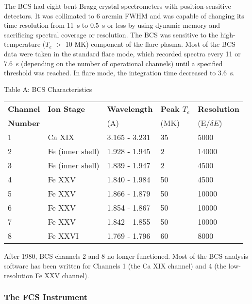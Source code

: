 The BCS had eight bent Bragg crystal spectrometers with position-sensitive
detectors. It was collimated to 6 arcmin FWHM and was capable of changing its
time resolution from 11~s to 0.5~s or less by using dynamic memory and
sacrificing spectral coverage or resolution. The BCS was sensitive to the 
high-temperature ($T_e$ $>$ 10 MK) component of the flare plasma. Most of the
BCS data were taken in the standard flare mode, which recorded spectra every 11
or 7.6~s (depending on the number of operational channels) until a specified
threshold was reached. In flare mode, the integration time decreased to
3.6~s. 

\begin{center}
                     Table A: BCS Characteristics
\bigskip
\begin{tabular}{||l l l l l ||}
\hline
{\bf Channel} &  {\bf Ion Stage} &   {\bf Wavelength}  &   {\bf Peak $T_e$} & 
{\bf Resolution} \\
{\bf Number}  &                  &         (A)         &   (MK)  &(E/$\delta E$)  \\
\hline
   1  &    Ca XIX          &  3.165 - 3.231   &    35     &        5000  \\
   2  &    Fe (inner shell)&  1.928 - 1.945   &     2     &       14000  \\
   3  &    Fe (inner shell)&  1.839 - 1.947   &     2     &        4500  \\
   4  &    Fe XXV          &  1.840 - 1.984   &    50     &        4500  \\
   5  &    Fe XXV          &  1.866 - 1.879   &    50     &       10000  \\
   6  &    Fe XXV          &  1.854 - 1.867   &    50     &       10000  \\
   7  &    Fe XXV          &  1.842 - 1.855   &    50     &       10000  \\
   8  &    Fe XXVI         &  1.769 - 1.796   &    60     &        8000  \\
\hline
\end{tabular}
\end{center}
 
After 1980, BCS channels 2 and 8 no longer functioned. Most of the BCS analysis
software has been written for Channels 1 (the Ca XIX channel) and 4 (the
low-resolution Fe XXV channel). 

\subsubsection{The FCS Instrument}

